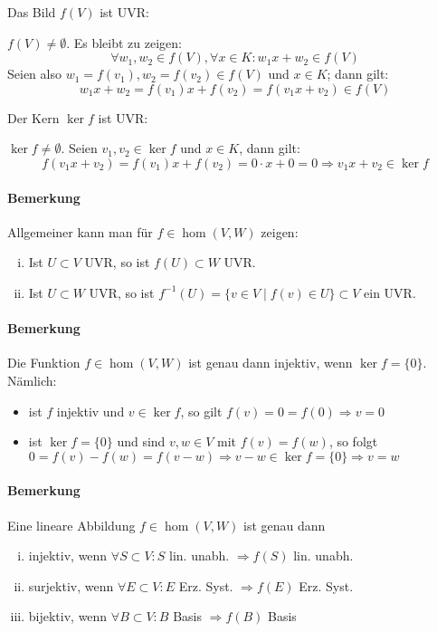  		Das Bild $f(V)$ ist UVR:
 		\begin{addmargin}[25pt]{0pt}
 			$f(V) \neq \emptyset$. Es bleibt zu zeigen:
 			\[
 				\forall w_1,w_2\in f(V), \forall x\in K: w_1x+w_2 \in f(V)
 			\]
 			Seien also $w_1 = f(v_1), w_2 = f(v_2) \in f(V)$ und $x\in K$; dann gilt:
 			\[
 				w_1x+w_2 = f(v_1)x+f(v_2) = f(v_1x+v_2)\in f(V)
 			\]
 		\end{addmargin}

 		Der Kern $\ker f$ ist UVR:
 		\begin{addmargin}[25pt]{0pt}
 			$\ker f\neq \emptyset$. Seien $v_1,v_2\in \ker f$ und $x\in K$, dann gilt:
 			\[
 				f(v_1x+v_2) = f(v_1)x+f(v_2) = 0\cdot x + 0 = 0 \Rightarrow v_1x+v_2\in \ker f
 			\]
 		\end{addmargin}

 	\paragraph{Bemerkung}
 		Allgemeiner kann man für $f\in \hom (V,W)$ zeigen:
 		\begin{enumerate}[(i)]
 			\item Ist $U\subset V$ UVR, so ist $f(U)\subset W$ UVR.
 			\item Ist $U\subset W$ UVR, so ist $f^{-1}(U) = \{v\in V\mid f(v) \in U \}\subset V$ ein UVR.
 		\end{enumerate}

 	\paragraph{Bemerkung}
 		Die Funktion $f\in \hom (V,W)$ ist genau dann injektiv, wenn $\ker f = \{0\}$. Nämlich:
 		\begin{itemize}
 			\item ist $f$ injektiv und $v\in \ker f$, so gilt $f(v) = 0 = f(0) \Rightarrow v=0$
 			\item ist $\ker f = \{ 0 \}$ und sind $v,w \in V$ mit $f(v) = f(w)$, so folgt $0=f(v)-f(w) = f(v-w) \Rightarrow v-w\in \ker f = \{0\} \Rightarrow v = w$
 		\end{itemize}

 	\paragraph{Bemerkung}
 		Eine lineare Abbildung $ f\in \hom (V,W) $ ist genau dann
 		\begin{enumerate}[(i)]
 			\item injektiv, wenn $ \forall S\subset V: S$ lin. unabh. $ \Rightarrow f(S) $ lin. unabh.
 			\item surjektiv, wenn $ \forall E \subset V:E $ Erz. Syst. $ \Rightarrow f(E)$ Erz. Syst.
 			\item bijektiv, wenn $ \forall B\subset V: B$ Basis $ \Rightarrow f(B)$ Basis
 		\end{enumerate}

